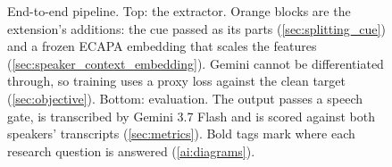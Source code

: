 \begin{figure}[!htb]
\caption{End-to-end pipeline. Top: the extractor. Orange blocks are the extension's additions: the cue passed as its parts (\autoref{sec:splitting_cue}) and a frozen ECAPA embedding that scales the features (\autoref{sec:speaker_context_embedding}). Gemini cannot be differentiated through, so training uses a proxy loss against the clean target (\autoref{sec:objective}). Bottom: evaluation. The output passes a speech gate, is transcribed by Gemini 3.7 Flash and is scored against both speakers' transcripts (\autoref{sec:metrics}). Bold tags mark where each research question is answered (\ref{ai:diagrams}).}
\label{fig:pipeline}
\end{figure}
